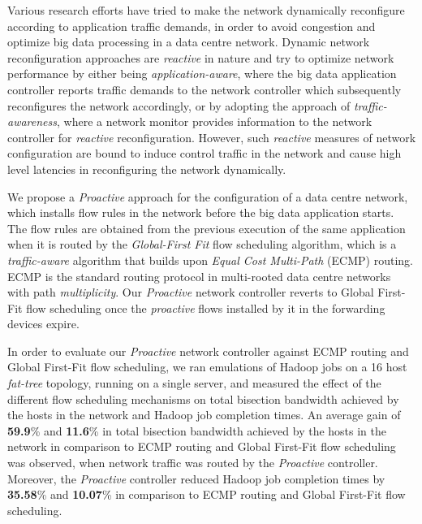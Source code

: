 Various research efforts \cite{das2013transparent, wang2012programming, al2010hedera, narayan2012hadoop, neves2014pythia, wette2015hybridte} have tried to make the network dynamically reconfigure according to application traffic demands, in order to avoid congestion and optimize big data processing in a data centre network. Dynamic network reconfiguration approaches are \textit{reactive} in nature and try to optimize network performance by either being \textit{application-aware}, where the big data application controller reports traffic demands to the network controller which subsequently reconfigures the network accordingly, or by adopting the approach of \textit{traffic-awareness}, where a network monitor provides information to the network controller for \textit{reactive} reconfiguration. However, such \textit{reactive} measures of network configuration are bound to induce control traffic in the network and cause high level latencies in reconfiguring the network dynamically. 

We propose a \textit{Proactive} approach for the configuration of a data centre network, which installs flow rules in the network before the big data application starts. The flow rules are obtained from the previous execution of the same application when it is routed by the \textit{Global-First Fit} \cite{al2010hedera} flow scheduling algorithm, which is a \textit{traffic-aware} algorithm that builds upon \textit{Equal Cost Multi-Path} (ECMP) routing. ECMP is the standard routing protocol in multi-rooted data centre networks with path \textit{multiplicity}. Our \textit{Proactive} network controller reverts to Global First-Fit flow scheduling once the \textit{proactive} flows installed by it in the forwarding devices expire. 

In order to evaluate our \textit{Proactive} network controller against ECMP routing and Global First-Fit flow scheduling, we ran emulations of Hadoop jobs on a 16 host \textit{fat-tree} topology, running on a single server, and measured the effect of the different flow scheduling mechanisms on total bisection bandwidth achieved by the hosts in the network and Hadoop job completion times. An average gain of \textbf{59.9}\% and \textbf{11.6}\% in total bisection bandwidth achieved by the hosts in the network in comparison to ECMP routing and Global First-Fit flow scheduling was observed, when network traffic was routed by the \textit{Proactive} controller. Moreover, the \textit{Proactive} controller reduced Hadoop job completion times by \textbf{35.58}\% and \textbf{10.07}\% in comparison to ECMP routing and Global First-Fit flow scheduling. 


